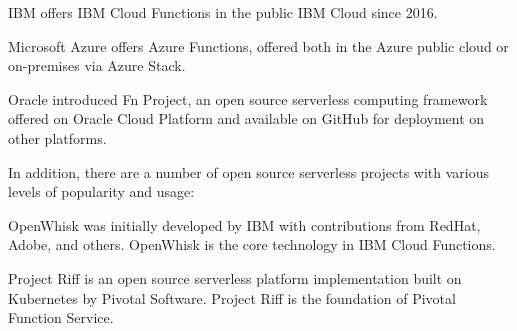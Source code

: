 IBM offers IBM Cloud Functions in the public IBM Cloud since 2016.

Microsoft Azure offers Azure Functions, offered both in the Azure public cloud or on-premises via Azure Stack.

Oracle introduced Fn Project, an open source serverless computing framework offered on Oracle Cloud Platform and available on GitHub for deployment on other platforms.

In addition, there are a number of open source serverless projects with various levels of popularity and usage:

OpenWhisk was initially developed by IBM with contributions from RedHat, Adobe, and others. OpenWhisk is the core technology in IBM Cloud Functions.

Project Riff is an open source serverless platform implementation built on Kubernetes by Pivotal Software. Project Riff is the foundation of Pivotal Function Service.




